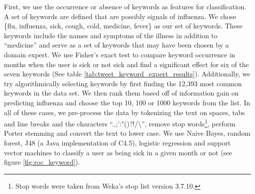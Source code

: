 \documentclass{acm_proc_article-sp}
\begin{document}
First, we use the occurrence or absence of keywords as features for classification. A set of keywords are defined that are possibly signals of influenza. We chose \{flu, influenza, sick, cough, cold, medicine, fever\} as our set of keywords. These keywords include the names and symptoms of the illness in addition to ``medicine'' and serve as a set of keywords that may have been chosen by a domain expert. We use Fisher's exact test to compare keyword occurrence in months when the user is sick or not sick and find a significant effect for six of the seven keywords (See table \ref{tab:tweet_keyword_expert_results}). Additionally, we try algorithmically selecting keywords by first finding the 12,393 most common keywords in the data set.  We then rank them based off of information gain on predicting influenza and choose the top 10, 100 or 1000 keywords from the list. In all of these cases, we pre-process the data by tokenizing the text on spaces, tabs and line breaks and the characters ``.,;':"()?!/\textbackslash '', remove stop words\footnote{Stop words were taken from Weka's stop list version 3.7.10.}, perform Porter stemming \cite{Porter:1980dd}  and convert the text to lower case. We use Naive Bayes, random forest, J48 (a Java implementation of C4.5), logistic regression and support vector machines to classify a user as being sick in a given month or not (see figure \ref{fig:roc_keyword}).
\end{document}
